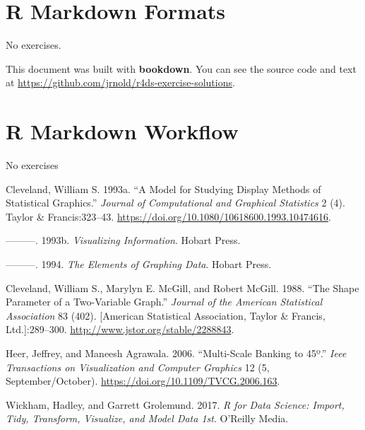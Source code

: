 \documentclass[]{book}
\theoremstyle{plain}
\theoremstyle{remark}
\theoremstyle{definition}
\theoremstyle{definition}
\theoremstyle{definition}
\theoremstyle{remark}
\begin{document}
\hypertarget{r-markdown-formats}{%
\chapter{R Markdown Formats}\label{r-markdown-formats}}

No exercises.

This document was built with \textbf{bookdown}. You can see the source
code and text at
\url{https://github.com/jrnold/r4ds-exercise-solutions}.

\hypertarget{r-markdown-workflow}{%
\chapter{R Markdown Workflow}\label{r-markdown-workflow}}

No exercises

\hypertarget{refs}{}
\leavevmode\hypertarget{ref-Cleveland1993a}{}%
Cleveland, William S. 1993a. ``A Model for Studying Display Methods of
Statistical Graphics.'' \emph{Journal of Computational and Graphical
Statistics} 2 (4). Taylor \& Francis:323--43.
\url{https://doi.org/10.1080/10618600.1993.10474616}.

\leavevmode\hypertarget{ref-Cleveland1993}{}%
---------. 1993b. \emph{Visualizing Information}. Hobart Press.

\leavevmode\hypertarget{ref-Cleveland1994}{}%
---------. 1994. \emph{The Elements of Graphing Data}. Hobart Press.

\leavevmode\hypertarget{ref-ClevelandMcGillMcGill1988}{}%
Cleveland, William S., Marylyn E. McGill, and Robert McGill. 1988. ``The
Shape Parameter of a Two-Variable Graph.'' \emph{Journal of the American
Statistical Association} 83 (402). {[}American Statistical Association,
Taylor \& Francis, Ltd.{]}:289--300.
\url{http://www.jstor.org/stable/2288843}.

\leavevmode\hypertarget{ref-HeerAgrawala2006}{}%
Heer, Jeffrey, and Maneesh Agrawala. 2006. ``Multi-Scale Banking to
45º.'' \emph{Ieee Transactions on Visualization and Computer Graphics}
12 (5, September/October). \url{https://doi.org/10.1109/TVCG.2006.163}.

\leavevmode\hypertarget{ref-WickhamGrolemund2017}{}%
Wickham, Hadley, and Garrett Grolemund. 2017. \emph{R for Data Science:
Import, Tidy, Transform, Visualize, and Model Data 1st}. O'Reilly Media.
\end{document}
